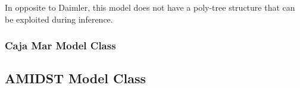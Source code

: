 In opposite to Daimler,  this model does not have a poly-tree structure that can be exploited during inference. 

\subsubsection*{Caja Mar Model Class}




\subsection{AMIDST Model Class}




